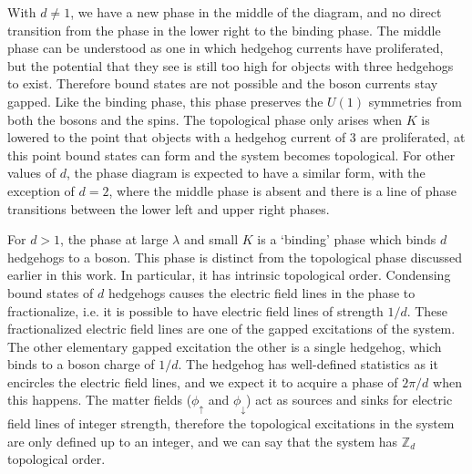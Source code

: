 \documentclass[prb,twocolumn]{revtex4-1}
\begin{document}
 With $d\neq 1$, we have a new phase in the middle of the diagram, and no direct transition from the phase in the lower right to the binding phase. The middle phase can be understood as one in which hedgehog currents have proliferated, but the potential that they see is still too high for objects with three hedgehogs to exist. Therefore bound states are not possible and the boson currents stay gapped. Like the binding phase, this phase preserves the $U(1)$ symmetries from both the bosons and the spins. The topological phase only arises when $K$ is lowered to the point that objects with a hedgehog current of $3$ are proliferated, at this point bound states can form and the system becomes topological. For other values of $d$, the phase diagram is expected to have a similar form, with the exception of $d=2$, where the middle phase is absent and there is a line of phase transitions between the lower left and upper right phases. 

For $d>1$, the phase at large $\lambda$ and small $K$ is a `binding' phase which binds $d$ hedgehogs to a boson. This phase is distinct from the topological phase discussed earlier in this work. In particular, it has intrinsic topological order. Condensing bound states of $d$ hedgehogs causes the electric field lines in the phase to fractionalize, i.e. it is possible to have electric field lines of strength $1/d$. These fractionalized electric field lines are one of the gapped excitations of the system. The other elementary gapped excitation the other is a single hedgehog, which binds to a boson charge of $1/d$. The hedgehog has well-defined statistics as it encircles the electric field lines, and we expect it to acquire a phase of $2\pi/d$ when this happens. The matter fields ($\phi_\uparrow$ and $\phi_\downarrow$) act as sources and sinks for electric field lines of integer strength, therefore the topological excitations in the system are only defined up to an integer, and we can say that the system has $\mathbb{Z}_d$ topological order.
\end{document}
